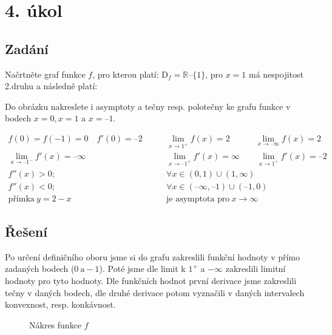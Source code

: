 \section{4. úkol}

\subsection{Zadání}
Načrtněte graf funkce $f$,
pro kterou platí: $\text{D}_{f} = \mathbb{R} – \{1\}$, pro $x = 1$ má nespojitost 2.druhu a následně platí:

Do obrázku nakreslete i asymptoty a tečny resp. polotečny ke grafu funkce v bodech $x = 0, x = 1$ a $x = –1$.

\begin{align*}
f(0) = f(-1) = 0\quad f'(0) = –2 &\qquad \lim_{x\rightarrow 1^{+}} f(x) = 2\qquad\quad\lim_{x\rightarrow –\infty} f(x) = 2\\
\lim_{x\rightarrow –1^{-}} f'(x) = – \infty&\qquad \lim_{x\rightarrow –1^{+}} f'(x) = \infty\qquad\lim_{x\rightarrow 1^{+}} f'(x) = – 2\\
f''(x) > 0;&\qquad\forall x \in (0, 1) \cup (1, \infty)\\
f''(x) < 0;&\qquad\forall x \in (–\infty, –1) \cup (–1,0)\\
\text{přímka}\ y = 2 - x &\qquad\text{je asymptota pro}\ x\rightarrow \infty
\end{align*}

\subsection{Řešení}
Po určení definičního oboru jsme si do grafu zakreslili funkční hodnoty v přímo zadaných bodech ($0\ \text{a} -1$). Poté jsme dle limit k $1^+$ a $-\infty$ zakreslili limitní hodnoty pro tyto hodnoty. Dle funkčních hodnot první derivace jsme zakreslili tečny v daných bodech, dle druhé derivace potom vyznačili v daných intervalech konvexnost, resp. konkávnost.

\begin{figure}[H]
	\centering
	
	\caption{Nákres funkce $f$}
\end{figure}